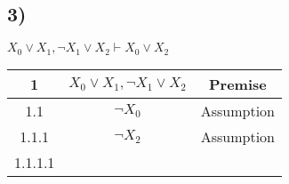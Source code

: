 \subsection*{3)}
$X_0 \vee X_1 , \neg X_1 \vee X_2 \vdash X_0 \vee X_2$\\

\begin{tabular}{c |c | c}
1 & $X_0 \vee X_1 , \neg X_1 \vee X_2$ & Premise\\
\hline
1.1 & $\neg X_0 $ & Assumption \\
1.1.1 & $\neg X_2 $ & Assumption \\
1.1.1.1 & $$
\end{tabular}

